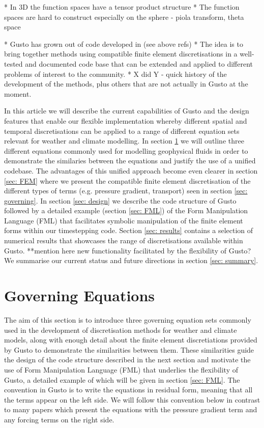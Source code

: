 \documentclass[journal abbreviation, manuscript]{copernicus}
\begin{document}
* In 3D the function spaces have a tensor product structure
* The function spaces are hard to construct especially on the sphere - piola transform, theta space

* Gusto has grown out of code developed in (see above refs)
* The idea is to bring together methods using compatible finite element discretisations in a well-tested and documented code base that can be extended and applied to different problems of interest to the community.
* X did Y - quick history of the development of the methods, plus others that are not actually in Gusto at the moment.

In this article we will describe the current capabilities of Gusto and
the design features that enable our flexible implementation whereby
different spatial and temporal discretisations can be applied to a
range of different equation sets relevant for weather and climate
modelling. In section \ref{sec: governing} we will outline three
different equations commonly used for modelling geophysical fluids in
order to demonstrate the similaries between the equations and justify
the use of a unified codebase. The advantages of this unified approach
become even clearer in section \ref{sec: FEM} where we present the
compatible finite element discretisation of the different types of
terms (e.g. pressure gradient, transport) seen in section \ref{sec:
  governing}. In section \ref{sec: design} we describe the code
structure of Gusto followed by a detailed example (section \ref{sec:
  FML}) of the Form Manipulation Language (FML) that facilitates
symbolic manipulation of the finite element forms within our
timestepping code. Section \ref{sec: results} contains a selection of
numerical results that showcases the range of discretisations
available within Gusto. **mention here new functionality facilitated
by the flexibility of Gusto? We summarise our current status and
future directions in section \ref{sec: summary}.

\section{Governing Equations}
\label{sec: governing}
The aim of this section is to introduce three governing equation sets
commonly used in the development of discretisation methods for weather
and climate models, along with enough detail about the finite element
discretiations provided by Gusto to demonstrate the similarities
between them. These similarities guide the design of the code
structure described in the next section and motivate the use of Form
Manipulation Language (FML) that underlies the flexibility of Gusto, a
detailed example of which will be given in section \ref{sec: FML}. The
convention in Gusto is to write the equations in residual form,
meaning that all the terms appear on the left side. We will follow
this convention below in contrast to many papers which present the
equations with the pressure gradient term and any forcing terms on the
right side.
\end{document}
